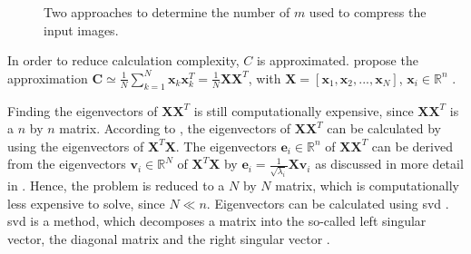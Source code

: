 \begin{figure}%
    \centering
    \qquad
    \caption[Approaches to find the number of \eigenfaces{}]{Two approaches to determine the number of \eigenfaces{} $m$ used to compress the input images.}%
    \label{fig:det_n_comp}%
\end{figure}

In order to reduce calculation complexity, $C$ is approximated.
\citeauthor{eigenfaces1997} propose the approximation $\textbf{C} \simeq \frac{1}{N}\sum_{k=1}^{N}\textbf{x}_{k}\textbf{x}_{k}^{T} = \frac{1}{N}\textbf{X}\textbf{X}^{T}$, 
with $\textbf{X} = \left[ \textbf{x}_{1}, \textbf{x}_{2}, ..., \textbf{x}_{N} \right]$, $\textbf{x}_i \in \mathbb{R}^{n}$ \cite{eigenfaces1997}.

Finding the eigenvectors of $\textbf{X}\textbf{X}^{T}$ is still computationally expensive, since $\textbf{X}\textbf{X}^{T}$ is a $n$ by $n$ matrix.
According to \citeauthor{eigenfaces1997}, the eigenvectors of $\textbf{X}\textbf{X}^{T}$ can be calculated by using the eigenvectors of $\textbf{X}^{T}\textbf{X}$.
The eigenvectors $\textbf{e}_i \in \mathbb{R}^{n}$ of $\textbf{X}\textbf{X}^{T}$ can be derived from the eigenvectors $\textbf{v}_i \in \mathbb{R}^{N}$ of $\textbf{X}^{T}\textbf{X}$ by 
$\textbf{e}_i = \frac{1}{\sqrt{\lambda_i}}\textbf{X}\textbf{v}_i$ as discussed in more detail in \cite{eigenfaces1997}.
Hence, the problem is reduced to a $N$ by $N$ matrix, which is computationally less expensive to solve, since $N \ll n$.
Eigenvectors can be calculated using \ac{svd} \cite{eigenfaces1997}.
\ac{svd} is a method, which decomposes a matrix into the so-called left singular vector, the diagonal matrix and the right singular vector \cite{dim_reduction2021}. 

